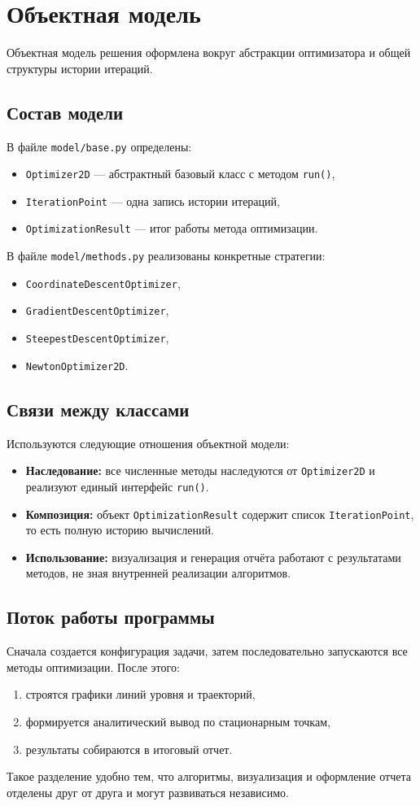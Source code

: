 \documentclass[12pt,a4paper]{article}
\begin{document}
\section{Объектная модель}
Объектная модель решения оформлена вокруг абстракции оптимизатора и общей структуры истории итераций.

\subsection{Состав модели}
В файле \texttt{model/base.py} определены:
\begin{itemize}
  \item \texttt{Optimizer2D} — абстрактный базовый класс с методом \texttt{run()},
  \item \texttt{IterationPoint} — одна запись истории итераций,
  \item \texttt{OptimizationResult} — итог работы метода оптимизации.
\end{itemize}

В файле \texttt{model/methods.py} реализованы конкретные стратегии:
\begin{itemize}
  \item \texttt{CoordinateDescentOptimizer},
  \item \texttt{GradientDescentOptimizer},
  \item \texttt{SteepestDescentOptimizer},
  \item \texttt{NewtonOptimizer2D}.
\end{itemize}

\subsection{Связи между классами}
Используются следующие отношения объектной модели:
\begin{itemize}
  \item \textbf{Наследование:} все численные методы наследуются от \texttt{Optimizer2D} и реализуют единый интерфейс \texttt{run()}.
  \item \textbf{Композиция:} объект \texttt{OptimizationResult} содержит список \texttt{IterationPoint}, то есть полную историю вычислений.
  \item \textbf{Использование:} визуализация и генерация отчёта работают с результатами методов, не зная внутренней реализации алгоритмов.
\end{itemize}

\subsection{Поток работы программы}
Сначала создается конфигурация задачи, затем последовательно запускаются все методы оптимизации. После этого:
\begin{enumerate}
  \item строятся графики линий уровня и траекторий,
  \item формируется аналитический вывод по стационарным точкам,
  \item результаты собираются в итоговый отчет.
\end{enumerate}

Такое разделение удобно тем, что алгоритмы, визуализация и оформление отчета отделены друг от друга и могут развиваться независимо.
\end{document}
